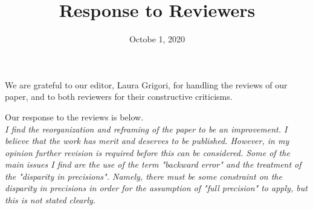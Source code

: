 \documentclass[final,onefignum,onetabnum]{siamart190516}
\begin{document}
\title{Response to Reviewers}
\date{Octobe 1, 2020}
\maketitle
We are grateful to our editor, Laura Grigori, for handling the reviews of our paper, and to both reviewers for their constructive criticisms.

Our response to the reviews is below.\\

{\it I find the reorganization and reframing of the paper to be an improvement. I believe that the work has merit and deserves to be published. However, in my opinion further revision is required before this can be considered. Some of the main issues I find are the use of the term "backward error" and the treatment of the "disparity in precisions". Namely, there must be some constraint on the disparity in precisions in order for the assumption of "full precision" to apply, but this is not stated clearly.}
\end{document}
